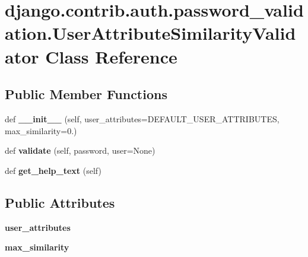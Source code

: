 \hypertarget{classdjango_1_1contrib_1_1auth_1_1password__validation_1_1_user_attribute_similarity_validator}{}\section{django.\+contrib.\+auth.\+password\+\_\+validation.\+User\+Attribute\+Similarity\+Validator Class Reference}
\label{classdjango_1_1contrib_1_1auth_1_1password__validation_1_1_user_attribute_similarity_validator}
\subsection*{Public Member Functions}
\begin{DoxyCompactItemize}
\item 
\mbox{\label{classdjango_1_1contrib_1_1auth_1_1password__validation_1_1_user_attribute_similarity_validator_a653744d5b28e83bb13d428d7602c50b5}} 
def {\bfseries \+\_\+\+\_\+init\+\_\+\+\_\+} (self, user\+\_\+attributes=D\+E\+F\+A\+U\+L\+T\+\_\+\+U\+S\+E\+R\+\_\+\+A\+T\+T\+R\+I\+B\+U\+T\+ES, max\+\_\+similarity=0.)
\item 
\mbox{\label{classdjango_1_1contrib_1_1auth_1_1password__validation_1_1_user_attribute_similarity_validator_aded7c57b17125ff05a6d47774e75ad17}} 
def {\bfseries validate} (self, password, user=None)
\item 
\mbox{\label{classdjango_1_1contrib_1_1auth_1_1password__validation_1_1_user_attribute_similarity_validator_ae71630b5e118846344e746555570b5a3}} 
def {\bfseries get\+\_\+help\+\_\+text} (self)
\end{DoxyCompactItemize}
\subsection*{Public Attributes}
\begin{DoxyCompactItemize}
\item 
\mbox{\label{classdjango_1_1contrib_1_1auth_1_1password__validation_1_1_user_attribute_similarity_validator_a2f49fb1af2d883316333592ca96438a1}} 
{\bfseries user\+\_\+attributes}
\item 
\mbox{\label{classdjango_1_1contrib_1_1auth_1_1password__validation_1_1_user_attribute_similarity_validator_a0558461072cae0c436580a7c35bc72c7}} 
{\bfseries max\+\_\+similarity}
\end{DoxyCompactItemize}
